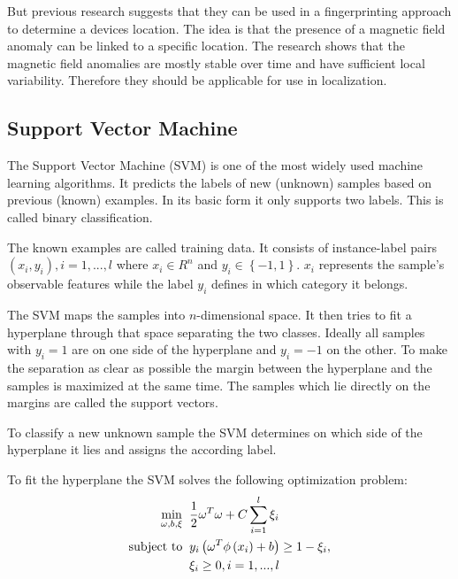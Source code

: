 But previous research suggests that they can be used in a fingerprinting approach to determine a devices location. The idea is that the presence of a magnetic field anomaly can be linked to a specific location. The research shows that the magnetic field anomalies are mostly stable over time and have sufficient local variability. Therefore they should be applicable for use in localization\cite{haverinen2009global,angermann2012CharacterizationMagnetic,Li2012feasableMagnetic}.

\subsection{Support Vector Machine}
\label{theory:SVM}
The Support Vector Machine (SVM) is one of the most widely used machine learning algorithms. It predicts the labels of new (unknown) samples based on previous (known) examples. In its basic form it only supports two labels. This is called binary classification.

The known examples are called training data. It consists of instance-label pairs \(\left ( x_{i}, y_{i} \right ), i=1,...,l\) where \(x_{i}\in R^{n}\) and \(y_{i}\in \left \{ -1,1 \right \}\). \(x_{i}\) represents the sample's observable features while the label \(y_{i}\) defines in which category it belongs.

The SVM maps the samples into \(n\)-dimensional space. It then tries to fit a hyperplane through that space separating the two classes. Ideally all samples with \(y_{i}=1\) are on one side of the hyperplane and \(y_{i}=-1\) on the other. To make the separation as clear as possible the margin between the hyperplane and the samples is maximized at the same time. The samples which lie directly on the margins are called the support vectors.

To classify a new unknown sample the SVM determines on which side of the hyperplane it lies and assigns the according label.

To fit the hyperplane the SVM solves the following optimization problem\cite{chang2011libsvm}:
\begin{equation}
\begin{split}
\min_{\omega , b ,\xi}\;\; & \frac{1}{2}\omega^{T}\omega +C\sum_{i=1}^{l}\xi_{i}\\
\textup{subject to}\;\; & y_{i}\left ( \omega^{T}\phi \left ( x_{i} \right )+b \right )\geq 1-\xi_{i},\\
& \xi_{i}\geq 0,i=1,...,l
\end{split}
\end{equation}

